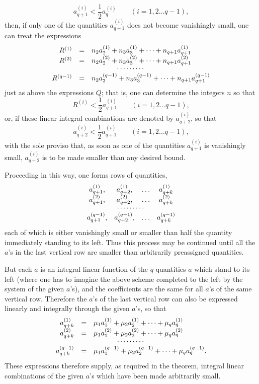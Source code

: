 \documentclass[10pt]{article}
\begin{document}
\[
a_{q+1}^{(i)}<\frac12a_q^{(i)}\qquad(i=1,2\ldots q-1),
\]
then, if only one of the quantities \(a_{q+1}^{(i)}\) does not become vanishingly small, one can treat the expressions
\[
\begin{array}{rcl}
R^{(1)}&=&n_2a_2^{(1)}+n_3a_3^{(1)}+\cdots+n_{q+1}a_{q+1}^{(1)}\\
R^{(2)}&=&n_2a_2^{(2)}+n_3a_3^{(2)}+\cdots+n_{q+1}a_{q+1}^{(2)}\\[-0.15em]
\multicolumn{3}{c}{\cdots\cdots\cdots}\\
R^{(q-1)}&=&n_2a_2^{(q-1)}+n_3a_3^{(q-1)}+\cdots+n_{q+1}a_{q+1}^{(q-1)}
\end{array}
\]
just as above the expressions \(Q\); that is, one can determine the integers \(n\) so that
\[
R^{(i)}<\frac12a_{q+1}^{(i)}\qquad(i=1,2\ldots q-1),
\]
or, if these linear integral combinations are denoted by \(a_{q+2}^{(i)}\), so that
\[
a_{q+2}^{(i)}<\frac12a_{q+1}^{(i)}\qquad(i=1,2\ldots q-1),
\]
with the sole proviso that, as soon as one of the quantities \(a_{q+1}^{(i)}\) is vanishingly small, \(a_{q+2}^{(i)}\) is to be made smaller than any desired bound.

Proceeding in this way, one forms rows of quantities,
\[
\begin{array}{cccc}
a_{q+1}^{(1)},&a_{q+2}^{(1)},&\ldots&a_{q+k}^{(1)}\\
a_{q+1}^{(2)},&a_{q+2}^{(2)},&\ldots&a_{q+k}^{(2)}\\[-0.15em]
\multicolumn{4}{c}{\cdots\cdots\cdots}\\
a_{q+1}^{(q-1)},&a_{q+2}^{(q-1)},&\ldots&a_{q+k}^{(q-1)}
\end{array}
\]
each of which is either vanishingly small or smaller than half the quantity immediately standing to its left. Thus this process may be continued until all the \(a\)'s in the last vertical row are smaller than arbitrarily preassigned quantities.

But each \(a\) is an integral linear function of the \(q\) quantities \(a\) which stand to its left (where one has to imagine the above scheme completed to the left by the system of the given \(a\)'s), and the coefficients are the same for all \(a\)'s of the same vertical row. Therefore the \(a\)'s of the last vertical row can also be expressed linearly and integrally through the given \(a\)'s, so that
\[
\begin{array}{rcl}
a_{q+k}^{(1)}&=&\mu_1a_1^{(1)}+\mu_2a_2^{(1)}+\cdots+\mu_qa_q^{(1)}\\
a_{q+k}^{(2)}&=&\mu_1a_1^{(2)}+\mu_2a_2^{(2)}+\cdots+\mu_qa_q^{(2)}\\[-0.15em]
\multicolumn{3}{c}{\cdots\cdots\cdots}\\
a_{q+k}^{(q-1)}&=&\mu_1a_1^{(q-1)}+\mu_2a_2^{(q-1)}+\cdots+\mu_qa_q^{(q-1)}.
\end{array}
\]
These expressions therefore supply, as required in the theorem, integral linear combinations of the given \(a\)'s which have been made arbitrarily small.
\end{document}
